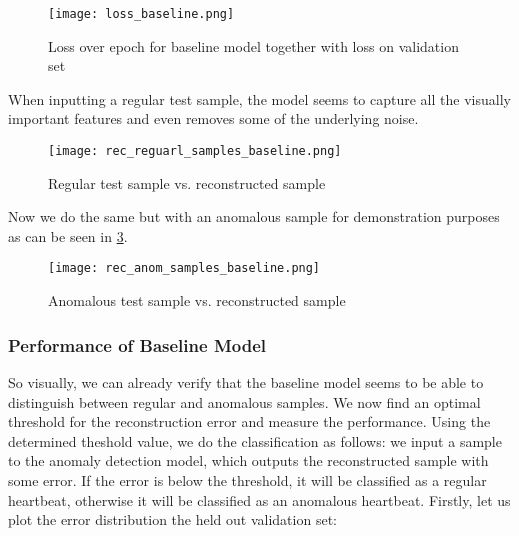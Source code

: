 \begin{figure}[h]
    \centering
    \texttt{[image: loss\_baseline.png]}
    \caption{Loss over epoch for baseline model together with loss on validation set}
    \label{fig:loss_baseline}
\end{figure}

When inputting a regular test sample, the model seems to capture all the visually important features and even removes some of the underlying noise.

\begin{figure}[H]
    \centering
    \texttt{[image: rec\_reguarl\_samples\_baseline.png]}
    \caption{Regular test sample vs. reconstructed sample}
    \label{fig:regog_vs_recon}
\end{figure}

Now we do the same but with an anomalous sample for demonstration purposes as can be seen in \cref{fig:anomog_vs_recon}.

\begin{figure}[h]
    \centering
    \texttt{[image: rec\_anom\_samples\_baseline.png]}
    \caption{Anomalous test sample vs. reconstructed sample}
    \label{fig:anomog_vs_recon}
\end{figure}

\subsubsection*{Performance of Baseline Model}
So visually, we can already verify that the baseline model seems to be able to distinguish between regular and anomalous samples. We now find an optimal threshold for the reconstruction error and measure the performance. Using the determined theshold value, we do the classification as follows: we input a sample to the anomaly detection model, which outputs the reconstructed sample with some error. If the error is below the threshold, it will be classified as a regular heartbeat, otherwise it will be classified as an anomalous heartbeat. Firstly, let us plot the error distribution the held out validation set:

